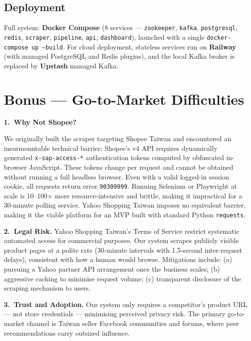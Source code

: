 \documentclass[11pt,a4paper]{article}
\begin{document}
\subsection{Deployment}

Full system: \textbf{Docker Compose} (8 services ---
\texttt{zookeeper}, \texttt{kafka}, \texttt{postgresql}, \texttt{redis},
\texttt{scraper}, \texttt{pipeline}, \texttt{api}, \texttt{dashboard}),
launched with a single \texttt{docker-compose up --build}. For cloud
deployment, stateless services run on \textbf{Railway} (with managed
PostgreSQL and Redis plugins), and the local Kafka broker is replaced by
\textbf{Upstash} managed Kafka.

\section{Bonus --- Go-to-Market Difficulties}

\textbf{1.\ Why Not Shopee?}

\begin{warnbox}
We originally built the scraper targeting Shopee Taiwan and encountered an
insurmountable technical barrier: Shopee's v4 API requires dynamically generated
\texttt{x-sap-access-*} authentication tokens computed by obfuscated in-browser
JavaScript. These tokens change per request and cannot be obtained without running
a full headless browser. Even with a valid logged-in session cookie, all requests
return error \texttt{90309999}. Running Selenium or Playwright at scale is
10--100$\times$ more resource-intensive and brittle, making it impractical for a
30-minute polling service. Yahoo Shopping Taiwan imposes no equivalent barrier,
making it the viable platform for an MVP built with standard Python \texttt{requests}.
\end{warnbox}

\textbf{2.\ Legal Risk.}
Yahoo Shopping Taiwan's Terms of Service restrict systematic automated access
for commercial purposes. Our system scrapes publicly visible product pages at a
polite rate (30-minute intervals with 1.5-second inter-request delays),
consistent with how a human would browse. Mitigations include:
(a) pursuing a Yahoo partner API arrangement once the business scales;
(b) aggressive caching to minimise request volume;
(c) transparent disclosure of the scraping mechanism to users.

\textbf{3.\ Trust and Adoption.}
Our system only requires a competitor's product URL --- not store credentials ---
minimising perceived privacy risk. The primary go-to-market channel is Taiwan
seller Facebook communities and forums, where peer recommendations carry outsized
influence.
\end{document}
